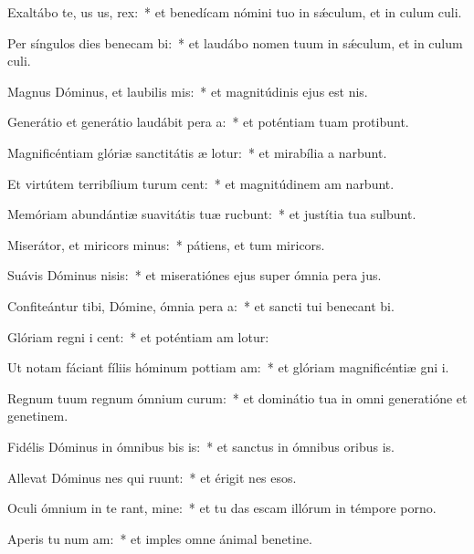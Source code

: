 \item Exaltábo te, us us, rex:~* et benedícam nómini tuo in sǽculum, et in culum culi.
\item Per síngulos dies benecam bi:~* et laudábo nomen tuum in sǽculum, et in culum culi.
\item Magnus Dóminus, et laubilis mis:~* et magnitúdinis ejus  est nis.
\item Generátio et generátio laudábit pera a:~* et poténtiam tuam protibunt.
\item Magnificéntiam glóriæ sanctitátis æ lotur:~* et mirabília a narbunt.
\item Et virtútem terribílium turum cent:~* et magnitúdinem am narbunt.
\item Memóriam abundántiæ suavitátis tuæ rucbunt:~* et justítia tua sulbunt.
\item Miserátor, et miricors minus:~* pátiens, et tum miricors.
\item Suávis Dóminus nisis:~* et miseratiónes ejus super ómnia pera jus.
\item Confiteántur tibi, Dómine, ómnia pera a:~* et sancti tui benecant bi.
\item Glóriam regni i cent:~* et poténtiam am lotur:
\item Ut notam fáciant fíliis hóminum pottiam am:~* et glóriam magnificéntiæ gni i.
\item Regnum tuum regnum ómnium curum:~* et dominátio tua in omni generatióne et genetinem.
\item Fidélis Dóminus in ómnibus bis is:~* et sanctus in ómnibus oribus is.
\item Allevat Dóminus nes qui ruunt:~* et érigit nes esos.
\item Oculi ómnium in te rant, mine:~* et tu das escam illórum in témpore porno.
\item Aperis tu num am:~* et imples omne ánimal benetine.
